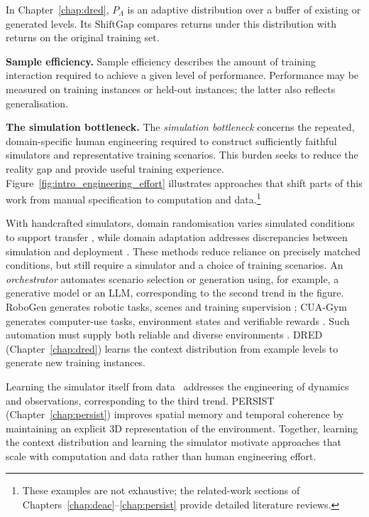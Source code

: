 In Chapter~\ref{chap:dred}, $P_\Lambda$ is an adaptive distribution over a buffer of existing or generated levels. Its $\text{ShiftGap}$ compares returns under this distribution with returns on the original training set.

\textbf{Sample efficiency.} Sample efficiency describes the amount of training interaction required to achieve a given level of performance. Performance may be measured on training instances or held-out instances; the latter also reflects generalisation.

\textbf{The simulation bottleneck.} The \textit{simulation bottleneck} concerns the repeated, domain-specific human engineering required to construct sufficiently faithful simulators and representative training scenarios. This burden seeks to reduce the reality gap and provide useful training experience. Figure~\ref{fig:intro_engineering_effort} illustrates approaches that shift parts of this work from manual specification to computation and data.\footnote{These examples are not exhaustive; the related-work sections of Chapters~\ref{chap:deac}--\ref{chap:persist} provide detailed literature reviews.}

With handcrafted simulators, domain randomisation varies simulated conditions to support transfer \citep{tobin2017domain}, while domain adaptation addresses discrepancies between simulation and deployment \citep{zhao2020simtoreal}. These methods reduce reliance on precisely matched conditions, but still require a simulator and a choice of training scenarios. An \textit{orchestrator} automates scenario selection or generation using, for example, a generative model or an LLM, corresponding to the second trend in the figure. RoboGen generates robotic tasks, scenes and training supervision \citep{wang2024robogen}; CUA-Gym generates computer-use tasks, environment states and verifiable rewards \citep{wang2026cuagym}. Such automation must supply both reliable and diverse environments \citep{li2026agentic}. DRED (Chapter~\ref{chap:dred}) learns the context distribution from example levels to generate new training instances.

Learning the simulator itself from data~\citep{hafner2025training,valevski2024diffusionmodelsrealtimegame,alonso2024diffusion} addresses the engineering of dynamics and observations, corresponding to the third trend. PERSIST (Chapter~\ref{chap:persist}) improves spatial memory and temporal coherence by maintaining an explicit 3D representation of the environment. Together, learning the context distribution and learning the simulator motivate approaches that scale with computation and data rather than human engineering effort.

